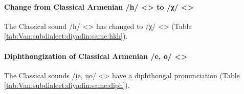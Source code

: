 \paragraph{Change from Classical Armenian /h/ <> to /χ/ <>} 

The Classical sound /h/ <> has changed to /χ/ <> (Table \ref{tab:Van:subdialect:diyadin:same:hkh}). 

\begin{table}[H]
	\centering
	\caption{Change from Classical /h/ <> to /χ/ <> in the Diyadin subdialect of the Van dialect}
	\label{tab:Van:subdialect:diyadin:same:hkh}
\end{table}

\paragraph{Diphthongization of Classical Armenian /e, o/ <>} 

The Classical sounds /i̯e, u̯o/ <> have a diphthongal pronunciation (Table \ref{tab:Van:subdialect:diyadin:same:diph}). 

